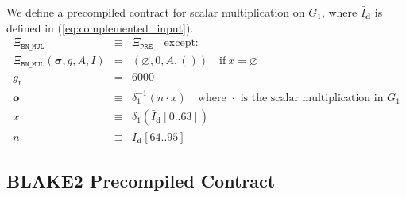 \documentclass[9pt,oneside]{amsart}
\begin{document}
We define a precompiled contract for scalar multiplication on $G_1$, where $\bar I_{\mathbf{d}}$ is defined in (\ref{eq:complemented_input}).
\begin{eqnarray}
\Xi_{\mathtt{BN\_MUL}}&\equiv&\Xi_{\mathtt{PRE}}\quad\text{except:}\\
\Xi_{\mathtt{BN\_MUL}}(\boldsymbol\sigma,g,A,I)&=&\left(\varnothing,0,A,()\right)\quad\text{if}\ x=\varnothing\\
g_{\mathrm{r}} &=& 6000\\
\mathbf{o}&\equiv&\delta_1^{-1}(n\cdot x)\quad\text{where $\cdot$ is the scalar multiplication in $G_1$}\\
x&\equiv&\delta_1\left(\bar I_{\mathbf{d}}[0..63]\right)\\
n&\equiv&\bar I_{\mathbf{d}}[64..95]
\end{eqnarray}

\subsection{BLAKE2 Precompiled Contract}
\end{document}
